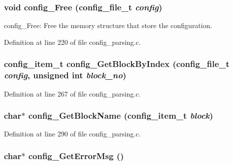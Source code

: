 \subsubsection[{config\_\-Free}]{\setlength{\rightskip}{0pt plus 5cm}void config\_\-Free (config\_\-file\_\-t {\em config})}\label{config__parsing_8c_21ff635ca4517f5da8111d943372e423}


config\_\-Free: Free the memory structure that store the configuration. 

Definition at line 220 of file config\_\-parsing.c.
\subsubsection[{config\_\-GetBlockByIndex}]{\setlength{\rightskip}{0pt plus 5cm}config\_\-item\_\-t config\_\-GetBlockByIndex (config\_\-file\_\-t {\em config}, \/  unsigned int {\em block\_\-no})}\label{config__parsing_8c_87362059b4e1951b3f1054e7c5a6fc9f}




Definition at line 267 of file config\_\-parsing.c.
\subsubsection[{config\_\-GetBlockName}]{\setlength{\rightskip}{0pt plus 5cm}char$\ast$ config\_\-GetBlockName (config\_\-item\_\-t {\em block})}\label{config__parsing_8c_075c7715682347ce04b089758e7aedab}




Definition at line 290 of file config\_\-parsing.c.
\subsubsection[{config\_\-GetErrorMsg}]{\setlength{\rightskip}{0pt plus 5cm}char$\ast$ config\_\-GetErrorMsg ()}\label{config__parsing_8c_ab9a6d7b5f77cb7b0da504e52ba61adf}




